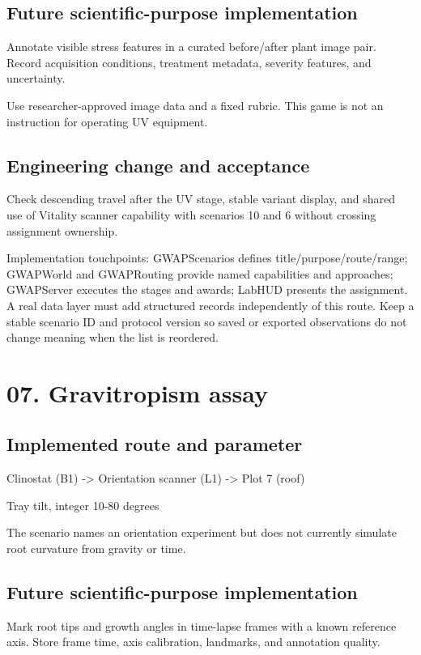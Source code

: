 \subsection{Future scientific-purpose implementation}
Annotate visible stress features in a curated before/\allowbreak{}after plant image pair.\allowbreak{} Record acquisition conditions, treatment metadata, severity features, and uncertainty.\allowbreak{}

Use researcher-approved image data and a fixed rubric.\allowbreak{} This game is not an instruction for operating UV equipment.\allowbreak{}

\subsection{Engineering change and acceptance}
Check descending travel after the UV stage, stable variant display, and shared use of Vitality scanner capability with scenarios 10 and 6 without crossing assignment ownership.\allowbreak{}

Implementation touchpoints: GWAPScenarios defines title/\allowbreak{}purpose/\allowbreak{}route/\allowbreak{}range; GWAPWorld and GWAPRouting provide named capabilities and approaches; GWAPServer executes the stages and awards; LabHUD presents the assignment.\allowbreak{} A real data layer must add structured records independently of this route.\allowbreak{} Keep a stable scenario ID and protocol version so saved or exported observations do not change meaning when the list is reordered.\allowbreak{}

\section{07.\allowbreak{} Gravitropism assay}
\subsection{Implemented route and parameter}
Clinostat (B1) -> Orientation scanner (L1) -> Plot 7 (roof)

Tray tilt, integer 10-80 degrees

The scenario names an orientation experiment but does not currently simulate root curvature from gravity or time.\allowbreak{}

\subsection{Future scientific-purpose implementation}
Mark root tips and growth angles in time-lapse frames with a known reference axis.\allowbreak{} Store frame time, axis calibration, landmarks, and annotation quality.\allowbreak{}

